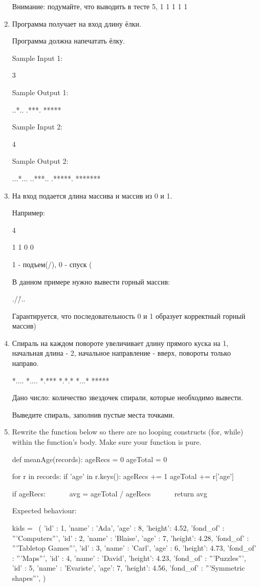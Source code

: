 \documentclass[]{article}
\begin{document}
\begin{enumerate}
Внимание: подумайте, что выводить в тесте 5, 1 1 1 1 1


\item
Программа получает на вход длину ёлки.

Программа должна напечатать ёлку.

Sample Input 1:

3

Sample Output 1:

..*..
.***.
*****

Sample Input 2:

4

Sample Output 2:

...*...
..***..
.*****.
*******


\item
На вход подается длина массива и массив из 0 и 1.

Например:

4

1 1 0 0

1 - подъем(/), 0 - спуск (\)

В данном примере нужно вывести горный массив:

./\.

/..\

Гарантируется, что последовательность 0 и 1 образует корректный горный массив)

\item
Спираль на каждом повороте увеличивает длину прямого куска на 1, начальная длина - 2, начальное направление - вверх, повороты только направо.

*....
*....
*.***
*.*.*
*...*
*****

Дано число: количество звездочек спирали, которые необходимо вывести.

Выведите спираль, заполнив пустые места точками.

\item
Rewrite the function below so there are no looping constructs (for, while) within the function's body. Make sure your function is pure.

def meanAge(records):
  ageRecs = 0
  ageTotal = 0

  for r in records:
    if 'age' in r.keys():
      ageRecs += 1
      ageTotal += r['age']

  if ageRecs:
   avg = ageTotal / ageRecs
   return avg


Expected behaviour:

kids = \
(
  {'id' : 1, 'name' : 'Ada', 'age' : 8, 'height': 4.52, 'fond_of' : '''Computers'''},
  {'id' : 2, 'name' : 'Blaise', 'age' : 7, 'height': 4.28, 'fond_of' : '''Tabletop Games'''},
  {'id' : 3, 'name' : 'Carl', 'age' : 6, 'height': 4.73, 'fond_of' : '''Maps'''},
  {'id' : 4, 'name' : 'David', 'height': 4.23, 'fond_of' : '''Puzzles'''},
  {'id' : 5, 'name' : 'Evariste', 'age': 7, 'height': 4.56, 'fond_of' : '''Symmetric shapes'''},
)


\end{enumerate}
\end{document}
